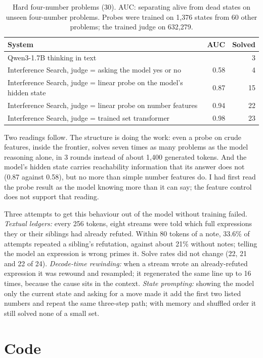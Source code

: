 \documentclass[10pt,twocolumn]{article}
\newcommand{\IS}{Interference Search}
\begin{document}
\begin{table}[t]
\centering\small
\begin{tabularx}{\columnwidth}{Xrr}
\toprule
System & AUC & Solved \\
\midrule
Qwen3-1.7B thinking in text & & 3 \\
\IS, judge = asking the model yes or no & 0.58 & 4 \\
\IS, judge = linear probe on the model's hidden state & 0.87 & 15 \\
\IS, judge = linear probe on number features & 0.94 & 22 \\
\IS, judge = trained set transformer & 0.98 & 23 \\
\bottomrule
\end{tabularx}
\caption{Hard four-number problems (30). AUC: separating alive from dead states on unseen four-number problems. Probes were trained on 1,376 states from 60 other problems; the trained judge on 632,279.}
\label{tab:llm}
\end{table}

Two readings follow. The structure is doing the work: even a probe on crude features, inside the frontier, solves seven times as many problems as the model reasoning alone, in 3 rounds instead of about 1,400 generated tokens. And the model's hidden state carries reachability information that its answer does not (0.87 against 0.58), but no more than simple number features do. I had first read the probe result as the model knowing more than it can say; the feature control does not support that reading.

Three attempts to get this behaviour out of the model without training failed. \emph{Textual ledgers:} every 256 tokens, eight streams were told which full expressions they or their siblings had already refuted. Within 80 tokens of a note, 33.6\% of attempts repeated a sibling's refutation, against about 21\% without notes; telling the model an expression is wrong primes it. Solve rates did not change (22, 21 and 22 of 24). \emph{Decode-time rewinding:} when a stream wrote an already-refuted expression it was rewound and resampled; it regenerated the same line up to 16 times, because the cause sits in the context. \emph{State prompting:} showing the model only the current state and asking for a move made it add the first two listed numbers and repeat the same three-step path; with memory and shuffled order it still solved none of a small set.

\section{Code}
\label{sec:code}
\end{document}
